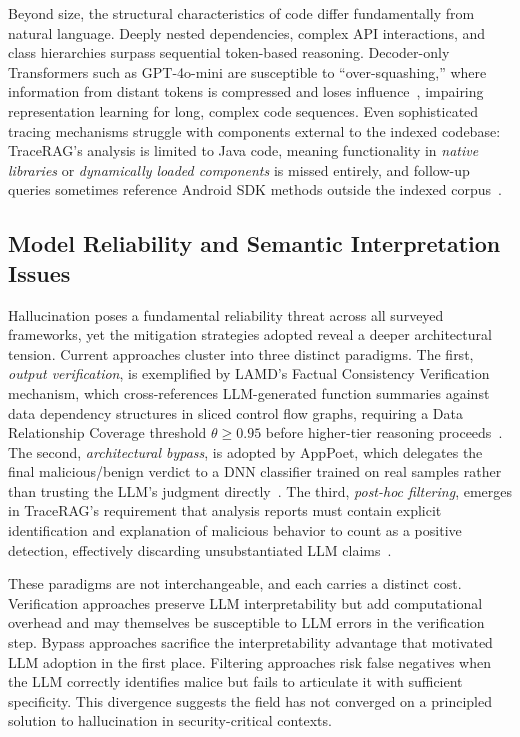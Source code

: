 Beyond size, the structural characteristics of code differ fundamentally from natural language. Deeply nested dependencies, complex API interactions, and class hierarchies surpass sequential token-based reasoning. Decoder-only Transformers such as GPT-4o-mini are susceptible to ``over-squashing,'' where information from distant tokens is compressed and loses influence~\cite{Qian2025-ua}, impairing representation learning for long, complex code sequences. Even sophisticated tracing mechanisms struggle with components external to the indexed codebase: TraceRAG's analysis is limited to Java code, meaning functionality in \textit{native libraries} or \textit{dynamically loaded components} is missed entirely, and follow-up queries sometimes reference Android SDK methods outside the indexed corpus~\cite{Zhang2025-ot}.

\subsection{Model Reliability and Semantic Interpretation Issues}

Hallucination poses a fundamental reliability threat across all surveyed frameworks, yet the mitigation strategies adopted reveal a deeper architectural tension. Current approaches cluster into three distinct paradigms. The first, \textit{output verification}, is exemplified by LAMD's Factual Consistency Verification mechanism, which cross-references LLM-generated function summaries against data dependency structures in sliced control flow graphs, requiring a Data Relationship Coverage threshold $\theta \ge 0.95$ before higher-tier reasoning proceeds~\cite{Qian2025-ua}. The second, \textit{architectural bypass}, is adopted by AppPoet, which delegates the final malicious/benign verdict to a DNN classifier trained on real samples rather than trusting the LLM's judgment directly~\cite{Zhao2024-dw}. The third, \textit{post-hoc filtering}, emerges in TraceRAG's requirement that analysis reports must contain explicit identification and explanation of malicious behavior to count as a positive detection, effectively discarding unsubstantiated LLM claims~\cite{Zhang2025-ot}.

These paradigms are not interchangeable, and each carries a distinct cost. Verification approaches preserve LLM interpretability but add computational overhead and may themselves be susceptible to LLM errors in the verification step. Bypass approaches sacrifice the interpretability advantage that motivated LLM adoption in the first place. Filtering approaches risk false negatives when the LLM correctly identifies malice but fails to articulate it with sufficient specificity. This divergence suggests the field has not converged on a principled solution to hallucination in security-critical contexts.

